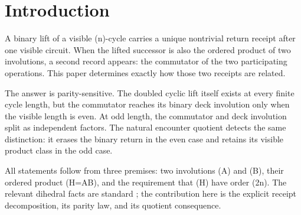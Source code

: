 \section{Introduction}

A binary lift of a visible (n)-cycle carries a unique nontrivial return
receipt after one visible circuit. When the lifted successor is also the
ordered product of two involutions, a second record appears: the commutator of
the two participating operations. This paper determines exactly how those two
receipts are related.

The answer is parity-sensitive. The doubled cyclic lift itself exists at every
finite cycle length, but the commutator reaches its binary deck involution only
when the visible length is even. At odd length, the commutator and deck
involution split as independent factors. The natural encounter quotient detects
the same distinction: it erases the binary return in the even case and retains
its visible product class in the odd case.

All statements follow from three premises: two involutions (A) and (B),
their ordered product (H=AB), and the requirement that (H) have order
(2n). The relevant dihedral facts are standard \cite{dummit-foote,rotman};
the contribution here is the explicit receipt decomposition, its parity law,
and its quotient consequence.

